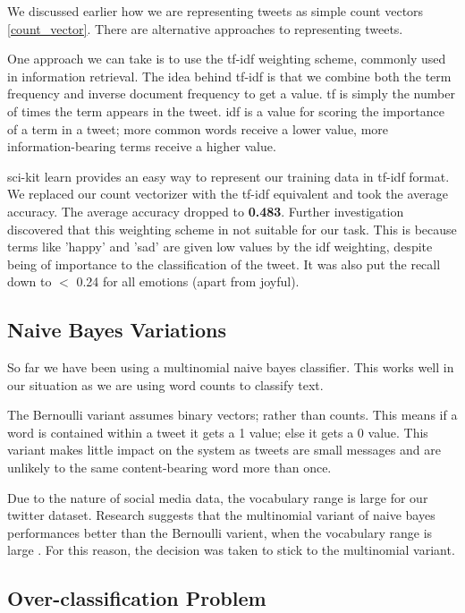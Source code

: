 We discussed earlier how we are representing tweets as simple count vectors \ref{count_vector}. There are alternative approaches to representing tweets. 

One approach we can take is to use the tf-idf weighting scheme, commonly used in information retrieval. The idea behind tf-idf is that we combine both the term frequency and inverse document frequency to get a value. tf is simply the number of times the term appears in the tweet. idf is a value for scoring the importance of a term in a tweet; more common words receive a lower value, more information-bearing terms receive a higher value.

sci-kit learn provides an easy way to represent our training data in tf-idf format. We replaced our count vectorizer with the tf-idf equivalent and took the average accuracy. The average accuracy dropped to \textbf{0.483}. Further investigation discovered that this weighting scheme in not suitable for our task. This is because terms like 'happy' and 'sad' are given low values by the idf weighting, despite being of importance to the classification of the tweet. It was also put the recall down to $<$ 0.24 for all emotions (apart from joyful).

\subsection{Naive Bayes Variations}

So far we have been using a multinomial naive bayes classifier. This works well in our situation as we are using word counts to classify text.

The Bernoulli variant assumes binary vectors; rather than counts. This means if a word is contained within a tweet it gets a 1 value; else it gets a 0 value. This variant makes little impact on the system as tweets are small messages and are unlikely to the same content-bearing word more than once.

Due to the nature of social media data, the vocabulary range is large for our twitter dataset. Research suggests that the multinomial variant of naive bayes performances better than the Bernoulli varient, when the vocabulary range is large \cite{mccallum1998comparison}. For this reason, the decision was taken to stick to the multinomial variant.

\subsection{Over-classification Problem}

